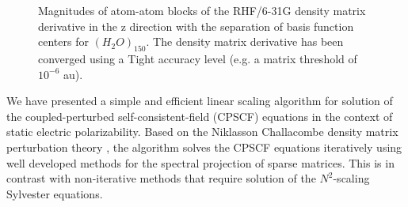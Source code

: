 \documentclass[prl,aps,twocolumn,showpacs,twocolumngrid,superbib]{revtex4}
\begin{document}
\begin{figure}
  \caption{\protect
    Magnitudes of atom-atom blocks of the RHF/6-31G density matrix derivative
    in the z direction with the separation of basis function centers for $(H_2O)_{150}$.
    The density matrix derivative has been converged using a Tight accuracy level (e.g. 
    a matrix threshold of $10^{-6}$ au).
  }\label{fig:DPrimeZ_150_6-31G}
\end{figure}

We have presented a simple and efficient linear scaling algorithm for 
solution of the coupled-perturbed self-consistent-field (CPSCF) equations 
in the context of static electric polarizability.  Based on the 
Niklasson Challacombe density matrix perturbation theory \cite{}, the 
algorithm solves the CPSCF equations iteratively using well developed
methods for the spectral projection of sparse matrices.  This is in contrast 
with non-iterative methods that require solution of the $N^2$-scaling 
Sylvester equations. 
\end{document}
